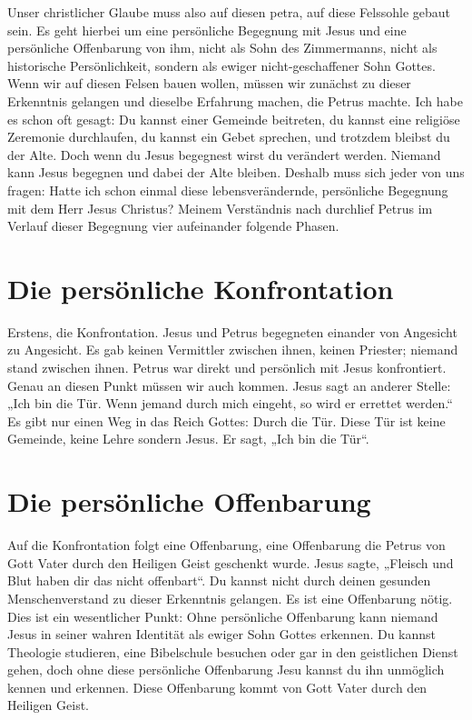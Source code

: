 Unser christlicher Glaube muss also auf diesen petra, auf diese Felssohle gebaut sein.
Es geht hierbei um eine persönliche Begegnung mit Jesus und eine persönliche Offenbarung von ihm, nicht als Sohn des Zimmermanns, nicht als historische Persönlichkeit, sondern als ewiger nicht-geschaffener Sohn Gottes.
Wenn wir auf diesen Felsen bauen wollen, müssen wir zunächst zu dieser Erkenntnis gelangen und dieselbe Erfahrung machen, die Petrus machte.
Ich habe es schon oft gesagt: Du kannst einer Gemeinde beitreten, du kannst eine religiöse Zeremonie durchlaufen, du kannst ein Gebet sprechen, und trotzdem bleibst du der Alte.
Doch wenn du Jesus begegnest wirst du verändert werden.
Niemand kann Jesus begegnen und dabei der Alte bleiben.
Deshalb muss sich jeder von uns fragen: Hatte ich schon einmal diese lebensverändernde, persönliche Begegnung mit dem Herr Jesus Christus?
Meinem Verständnis nach durchlief Petrus im Verlauf dieser Begegnung vier aufeinander folgende Phasen.

\section{Die persönliche Konfrontation}

Erstens, die Konfrontation. Jesus und Petrus begegneten einander von Angesicht zu Angesicht.
Es gab keinen Vermittler zwischen ihnen, keinen Priester; niemand stand zwischen ihnen.
Petrus war direkt und persönlich mit Jesus konfrontiert. Genau an diesen Punkt müssen wir auch kommen.
Jesus sagt an anderer Stelle: „Ich bin die Tür. Wenn jemand durch mich eingeht, so wird er errettet werden.“
Es gibt nur einen Weg in das Reich Gottes: Durch die Tür.
Diese Tür ist keine Gemeinde, keine Lehre sondern Jesus.
Er sagt, „Ich bin die Tür“.

\section{Die persönliche Offenbarung}

Auf die Konfrontation folgt eine Offenbarung, eine Offenbarung die Petrus von Gott Vater durch den Heiligen Geist geschenkt wurde.
Jesus sagte, „Fleisch und Blut haben dir das nicht offenbart“.
Du kannst nicht durch deinen gesunden Menschenverstand zu dieser Erkenntnis gelangen.
Es ist eine Offenbarung nötig.
Dies ist ein wesentlicher Punkt: Ohne persönliche Offenbarung kann niemand Jesus in seiner wahren Identität als ewiger Sohn Gottes erkennen.
Du kannst Theologie studieren, eine Bibelschule besuchen oder gar in den geistlichen Dienst gehen, doch ohne diese persönliche Offenbarung Jesu kannst du ihn unmöglich kennen und erkennen.
Diese Offenbarung kommt von Gott Vater durch den Heiligen Geist.

